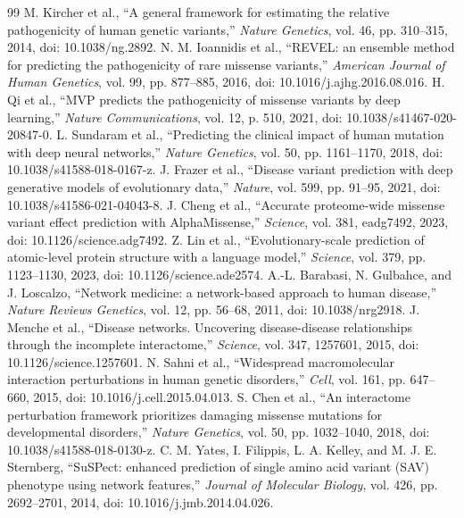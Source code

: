 \documentclass[conference]{IEEEtran}
\begin{document}
\begin{thebibliography}{99}
 M. Kircher et al., ``A general framework for estimating the relative pathogenicity of human genetic variants,'' \emph{Nature Genetics}, vol. 46, pp. 310--315, 2014, doi: 10.1038/ng.2892.
 N. M. Ioannidis et al., ``REVEL: an ensemble method for predicting the pathogenicity of rare missense variants,'' \emph{American Journal of Human Genetics}, vol. 99, pp. 877--885, 2016, doi: 10.1016/j.ajhg.2016.08.016.
 H. Qi et al., ``MVP predicts the pathogenicity of missense variants by deep learning,'' \emph{Nature Communications}, vol. 12, p. 510, 2021, doi: 10.1038/s41467-020-20847-0.
 L. Sundaram et al., ``Predicting the clinical impact of human mutation with deep neural networks,'' \emph{Nature Genetics}, vol. 50, pp. 1161--1170, 2018, doi: 10.1038/s41588-018-0167-z.
 J. Frazer et al., ``Disease variant prediction with deep generative models of evolutionary data,'' \emph{Nature}, vol. 599, pp. 91--95, 2021, doi: 10.1038/s41586-021-04043-8.
 J. Cheng et al., ``Accurate proteome-wide missense variant effect prediction with AlphaMissense,'' \emph{Science}, vol. 381, eadg7492, 2023, doi: 10.1126/science.adg7492.
 Z. Lin et al., ``Evolutionary-scale prediction of atomic-level protein structure with a language model,'' \emph{Science}, vol. 379, pp. 1123--1130, 2023, doi: 10.1126/science.ade2574.
 A.-L. Barabasi, N. Gulbahce, and J. Loscalzo, ``Network medicine: a network-based approach to human disease,'' \emph{Nature Reviews Genetics}, vol. 12, pp. 56--68, 2011, doi: 10.1038/nrg2918.
 J. Menche et al., ``Disease networks. Uncovering disease-disease relationships through the incomplete interactome,'' \emph{Science}, vol. 347, 1257601, 2015, doi: 10.1126/science.1257601.
 N. Sahni et al., ``Widespread macromolecular interaction perturbations in human genetic disorders,'' \emph{Cell}, vol. 161, pp. 647--660, 2015, doi: 10.1016/j.cell.2015.04.013.
 S. Chen et al., ``An interactome perturbation framework prioritizes damaging missense mutations for developmental disorders,'' \emph{Nature Genetics}, vol. 50, pp. 1032--1040, 2018, doi: 10.1038/s41588-018-0130-z.
 C. M. Yates, I. Filippis, L. A. Kelley, and M. J. E. Sternberg, ``SuSPect: enhanced prediction of single amino acid variant (SAV) phenotype using network features,'' \emph{Journal of Molecular Biology}, vol. 426, pp. 2692--2701, 2014, doi: 10.1016/j.jmb.2014.04.026.

\end{thebibliography}
\end{document}
